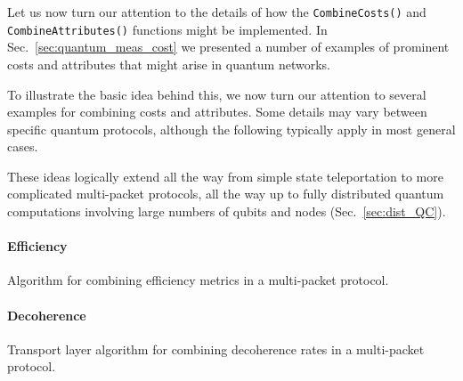 Let us now turn our attention to the details of how the \texttt{CombineCosts()} and \texttt{CombineAttributes()} functions might be implemented. In Sec.~\ref{sec:quantum_meas_cost} we presented a number of examples of prominent costs and attributes that might arise in quantum networks.

To illustrate the basic idea behind this, we now turn our attention to several examples for combining costs and attributes. Some details may vary between specific quantum protocols, although the following typically apply in most general cases.

These ideas logically extend all the way from simple state teleportation to more complicated multi-packet protocols, all the way up to fully distributed quantum computations involving large numbers of qubits and nodes (Sec.~\ref{sec:dist_QC}).


%
%

\paragraph{Efficiency} 

\begin{table}[!htbp]
\caption{Algorithm for combining efficiency metrics in a multi-packet protocol.} \label{alg:combine_eff}
\end{table}


%
%

\paragraph{Decoherence} 

\begin{table}[!htbp]
\caption{Transport layer algorithm for combining decoherence rates in a multi-packet protocol.} \label{alg:combine_lat}
\end{table}

